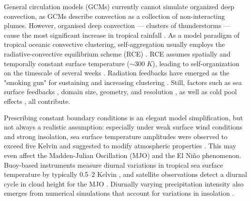 \documentclass{article}
\begin{document}
\noindent
General circulation models (GCMs) currently cannot simulate organized deep convection, as GCMs describe convection as a collection of non-interacting plumes. 
However, organised deep convection --- clusters of thunderstorms --- 
cause the most significant increase in tropical rainfall \cite{tan2015increases}. 
As a model paradigm of tropical oceanic convective clustering, self-aggregation
usually employs the radiative-convective equilibrium scheme (RCE) \cite{held1993radiative,tompkins1998radiative}. 
RCE assumes spatially and temporally constant surface temperature ($\sim 300\;K$), leading to self-organization on the timescale of several weeks \cite{bretherton2005energy,khairoutdinov2010aggregation,muller2012detailed,wing2017convective}. 
Radiation feedbacks have emerged as the "smoking gun" for sustaining and increasing clustering \cite{bretherton2005energy}. 
Still, factors such as sea surface feedbacks \cite{hohenegger2016coupled}, domain size, geometry, and resolution \cite{muller2015favors}, as well as cold pool effects \cite{jeevanjee2013convective,haerter2019convective}, all contribute.

Prescribing constant boundary conditions is an elegant model simplification, but not always a realistic assumption: 
especially under weak surface wind conditions and strong insolation, sea surface temperature amplitudes were observed to exceed five Kelvin and suggested to modify atmospheric properties \cite{kawai2007diurnal}. 
This may even affect the Madden-Julian Oscillation (MJO) and the El Ni\~no phenomenon.
Buoy-based instruments measure diurnal variations in tropical sea surface temperature by typically 0.5--2 Kelvin \cite{weller1996surface,johnson1999trimodal}, and satellite observations detect a diurnal cycle in cloud height for the MJO \cite{suzuki2009diurnal,tian2006modulation}.
Diurnally varying precipitation intensity also emerges from numerical simulations that account for variations in insolation \cite{liu1998numerical}. 
\end{document}
